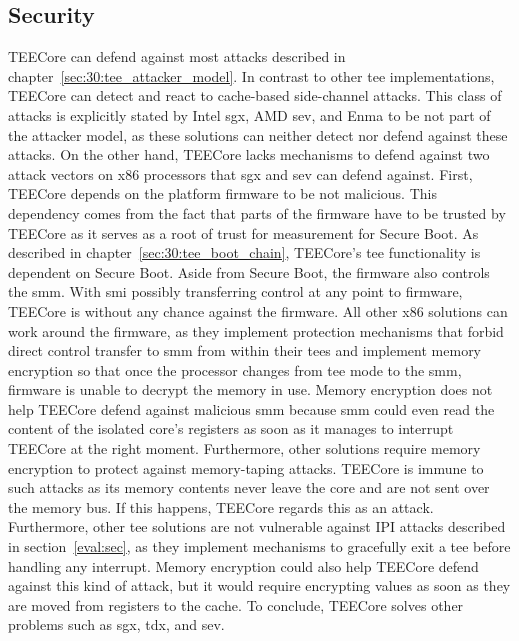 \subsection{Security}
\label{eval:compare:security}
TEECore can defend against most attacks described in
chapter~\ref{sec:30:tee_attacker_model}. In contrast to other \gls{tee}
implementations, TEECore can detect and react to cache-based side-channel
attacks. This class of attacks is explicitly stated by Intel \gls{sgx}, AMD
\gls{sev}, and Enma to be not part of the attacker model, as these solutions can
neither detect nor defend against these attacks. On the other hand, TEECore
lacks mechanisms to defend against two attack vectors on x86 processors that
\gls{sgx} and \gls{sev} can defend against. First, TEECore depends on the
platform firmware to be not malicious. This dependency comes from the fact that
parts of the firmware have to be trusted by TEECore as it serves as a root of
trust for measurement for Secure Boot. As described in
chapter~\ref{sec:30:tee_boot_chain}, TEECore's \gls{tee} functionality is
dependent on Secure Boot. Aside from Secure Boot, the firmware also controls the
\gls{smm}. With \gls{smi} possibly transferring control at any point to
firmware, TEECore is without any chance against the firmware. All other x86
solutions can work around the firmware, as they implement protection mechanisms
that forbid direct control transfer to \gls{smm} from within their \glspl{tee}
and implement memory encryption so that once the processor changes from
\gls{tee} mode to the \gls{smm}, firmware is unable to decrypt the memory in
use. Memory encryption does not help TEECore defend against malicious \gls{smm}
because \gls{smm} could even read the content of the isolated core's registers
as soon as it manages to interrupt TEECore at the right moment. Furthermore,
other solutions require memory encryption to protect against memory-taping
attacks. TEECore is immune to such attacks as its memory contents never leave
the core and are not sent over the memory bus. If this happens, TEECore regards
this as an attack. Furthermore, other \gls{tee} solutions are not vulnerable
against IPI attacks described in section~\ref{eval:sec}, as they implement
mechanisms to gracefully exit a \gls{tee} before handling any interrupt. Memory
encryption could also help TEECore defend against this kind of attack, but it
would require encrypting values as soon as they are moved from registers to the
cache. To conclude, TEECore solves other problems such as \gls{sgx}, \gls{tdx},
and \gls{sev}. \\

